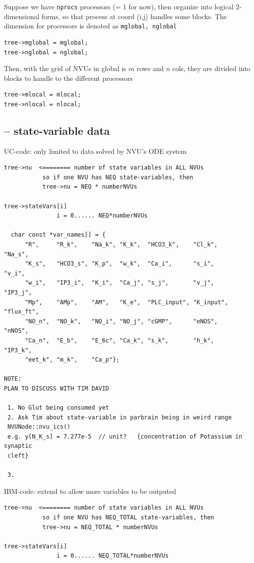 Suppose we have \verb!nprocs! processors (= 1 for now), then organize into
logical 2-dimensional forms, so that process at coord (i,j) handles some blocks.
The dimension for processors is denoted as \verb!mglobal, nglobal!
\begin{verbatim}
tree->mglobal = mglobal;
tree->nglobal = nglobal;
\end{verbatim}

Then, with the grid of NVUs in global  is $m$ rows and $n$ cols, they are
divided into blocks to handle to the different processors
\begin{verbatim}
tree->mlocal = mlocal;
tree->nlocal = nlocal;
\end{verbatim}

\subsection{-- state-variable data}
\label{sec:Htree-workspace-state-variable-data}


UC-code: only limited to data solved by NVU's ODE system
\begin{verbatim}
tree->nu  <======== number of state variables in ALL NVUs
           so if one NVU has NEQ state-variables, then 
           tree->nu = NEQ * numberNVUs

tree->stateVars[i]
               i = 0...... NEQ*numberNVUs

  char const *var_names[] = {
      "R",     "R_k",    "Na_k", "K_k",  "HCO3_k",    "Cl_k",    "Na_s",
      "K_s",   "HCO3_s", "K_p",  "w_k",  "Ca_i",      "s_i",     "v_i",
      "w_i",   "IP3_i",  "K_i",  "Ca_j", "s_j",       "v_j",     "IP3_j",
      "Mp",    "AMp",    "AM",   "K_e",  "PLC_input", "K_input", "flux_ft",
      "NO_n",  "NO_k",   "NO_i", "NO_j", "cGMP",      "eNOS",    "nNOS",
      "Ca_n",  "E_b",    "E_6c", "Ca_k", "s_k",       "h_k",     "IP3_k",
      "eet_k", "m_k",    "Ca_p"};
      
NOTE: 
PLAN TO DISCUSS WITH TIM DAVID
 
 1. No Glut being consumed yet
 2. Ask Tim about state-variable in parbrain being in weird range
 NVUNode::nvu_ics()
 e.g. y[N_K_s] = 7.277e-5  // unit?   {concentration of Potassium in synaptic
 cleft}
 
 3. 
\end{verbatim}

IBM-code: extend to allow more variables to be outputed
\begin{verbatim}
tree->nu  <======== number of state variables in ALL NVUs
           so if one NVU has NEQ_TOTAL state-variables, then 
           tree->nu = NEQ_TOTAL * numberNVUs

tree->stateVars[i]
               i = 0...... NEQ_TOTAL*numberNVUs

\end{verbatim}


